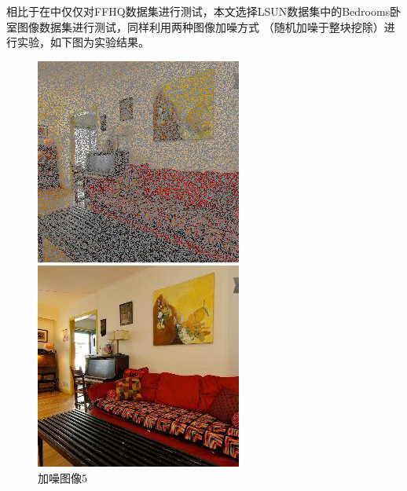 相比于在\cite{Inverse}中仅仅对FFHQ数据集进行测试，本文选择LSUN数据集中的Bedrooms卧室图像数据集进行测试，同样利用两种图像加噪方式 （随机加噪于整块挖除）进行实验，如下图为实验结果。
\begin{figure}[H]
  \centering
  \begin{minipage}[b]{0.3\linewidth}
\includegraphics[width=\linewidth]{Picture/input/00007.png}
    \caption{加噪图像5}
    \label{noised image 5 }
  \end{minipage}
  \hspace{0.1cm} %
   \begin{minipage}[b]{0.3\linewidth}
    \includegraphics[width=\linewidth]{Picture/label/00007.png}

\end{minipage}
\end{figure}
